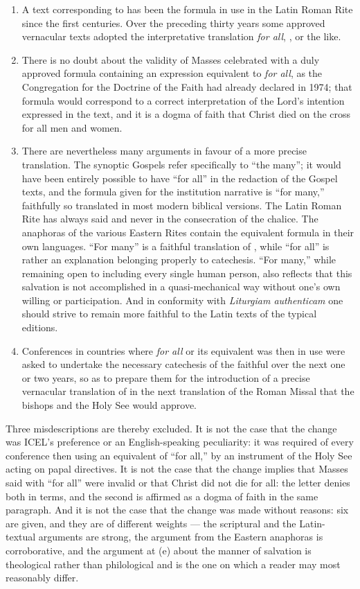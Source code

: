 \begin{enumerate}
\item A text corresponding to  has been the formula in use in the Latin Roman
Rite since the first centuries. Over the preceding thirty years some approved vernacular texts
adopted the interpretative translation \emph{for all}, , or the like.
\item There is no doubt about the validity of Masses celebrated with a duly approved formula
containing an expression equivalent to \emph{for all}, as the Congregation for the Doctrine of
the Faith had already declared in 1974; that formula would correspond to a correct
interpretation of the Lord's intention expressed in the text, and it is a dogma of faith that
Christ died on the cross for all men and women.
\item There are nevertheless many arguments in favour of a more precise translation. The
synoptic Gospels refer specifically to ``the many''; it would have been entirely possible to
have ``for all'' in the redaction of the Gospel texts, and the formula given for the institution
narrative is ``for many,'' faithfully so translated in most modern biblical versions. The Latin
Roman Rite has always said  and never  in the consecration
of the chalice. The anaphoras of the various Eastern Rites contain the equivalent formula in
their own languages. ``For many'' is a faithful translation of , while ``for
all'' is rather an explanation belonging properly to catechesis. ``For many,'' while remaining
open to including every single human person, also reflects that this salvation is not
accomplished in a quasi-mechanical way without one's own willing or participation. And in
conformity with \emph{Liturgiam authenticam} one should strive to remain more faithful to the
Latin texts of the typical editions.
\item Conferences in countries where \emph{for all} or its equivalent was then in use were
asked to undertake the necessary catechesis of the faithful over the next one or two years, so
as to prepare them for the introduction of a precise vernacular translation of  in the next translation of the Roman Missal that the bishops and the Holy See would
approve.
\end{enumerate}

Three misdescriptions are thereby excluded. It is not the case that the change was ICEL's
preference or an English-speaking peculiarity: it was required of every conference then using an
equivalent of ``for all,'' by an instrument of the Holy See acting on papal directives. It is
not the case that the change implies that Masses said with ``for all'' were invalid or that
Christ did not die for all: the letter denies both in terms, and the second is affirmed as a
dogma of faith in the same paragraph. And it is not the case that the change was made without
reasons: six are given, and they are of different weights --- the scriptural and the
Latin-textual arguments are strong, the argument from the Eastern anaphoras is corroborative, and
the argument at (e) about the manner of salvation is theological rather than philological and is
the one on which a reader may most reasonably differ.

